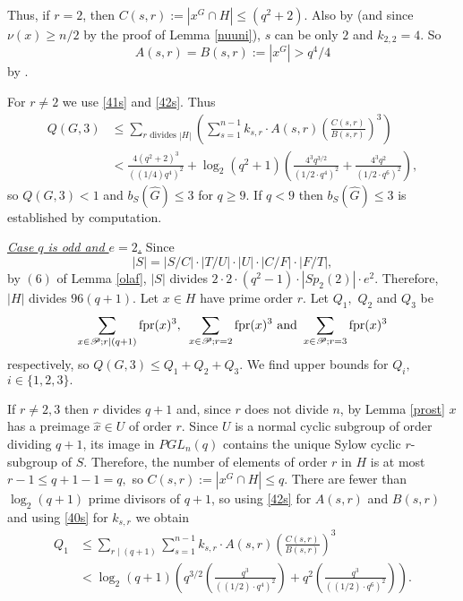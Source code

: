 Thus, if $r=2$, then $C(s,r):=|x^G \cap H|\le (q^2+2)$. Also by \cite[Table 3.8]{fpr2} (and since $\nu(x) \ge n/2$ by the proof of Lemma \ref{nuuni}), $s$ can be only  $2$ and $k_{2,2}=4.$ So
\begin{equation}\label{polup2s}
A(s,r)=B(s,r):=|x^G|> q^{4}/4
\end{equation}
by \cite[Proposition 3.37]{fpr2}. 

For $r\ne 2$ we use \eqref{41s} and \eqref{42s}. Thus
\begin{equation*}
\begin{aligned}
Q(G,3) & \le  \sum_{r \text{ divides } |H|} \left(
\sum_{s=1}^{n-1} k_{s,r} \cdot A(s,r) \left(\frac{C(s,r)}{B(s,r)}  \right)^3 \right)\\
 & <   \frac{4(q^2+2)^3}{((1/4)q^4)^2}  
+\log_2 \left( q^2+1 \right) \left(\frac{4^3 q^{3/2}}{(1/2 \cdot q^4)^2}  + \frac{4^3q^2}{(1/2 \cdot q^{6})^2}  \right),
\end{aligned}
\end{equation*}
so $Q(G,3)<1$ and $b_S(\hat{G})\le 3$ for  $q \ge 9.$ If $q<9$ then $b_S(\hat{G})\le 3$ is established by computation.

\medskip

\underline{\it Case ${q}$ is odd and ${e=2}$.}
 Since $$|S|= |S/C|\cdot|T/U |\cdot|U|\cdot|C/F |\cdot|F/T |,$$ by $(6)$ of Lemma \ref{olaf}, $|S|$ divides
$2 \cdot 2 \cdot (q^2-1) \cdot |Sp_2(2)| \cdot e^2.$
Therefore,  $|H|$ divides $96(q+1).$ Let $x \in H$ have prime order $r$.  Let $Q_1,$ $Q_2$ and $Q_3$ be  $$\sum_{{x} \in \mathscr{P}; r \mid (q+1)}{\mathrm{fpr}}({x})^3, \text{ } \sum_{{x} \in \mathscr{P}; r=2}{\mathrm{fpr}}({x})^3 \text{ and } \sum_{{x} \in \mathscr{P}; r=3}{\mathrm{fpr}}({x})^3$$ respectively, so $Q(G,3)\le Q_1 + Q_2 +Q_3$. We  find upper bounds for $Q_i,$ $i \in \{1,2,3\}.$

If $r \ne 2, 3$ then $r$ divides $q+1$ and, since $r$ does not divide $n$, by Lemma \ref{prost} $x$ has a preimage $\hat{x} \in U$ of order $r$. Since $U$ is a normal cyclic subgroup of order dividing $q+1$, its image in $PGL_n(q)$ contains the unique Sylow cyclic $r$-subgroup of $S.$ Therefore, the number of elements of order $r$ in $H$ is at most $r-1\le q+1-1=q,$ so $C(s,r):=|x^G \cap H|\le q$. There are fewer than $\log_2(q+1)$ prime divisors of $q+1$, so using \eqref{42s} for $A(s,r)$ and $B(s,r)$ and  using \eqref{40s} for $k_{s,r}$ we obtain
\begin{equation*}
\begin{aligned}
Q_1& \le \sum_{r \mid (q+1)} 
\sum_{s=1}^{n-1} k_{s,r} \cdot A(s,r) \left(\frac{C(s,r)}{B(s,r)}  \right)^3\\
&<    
\log_2(q+1) \left(q^{3/2}\left(\frac{q^3}{((1/2) \cdot q^4)^2} \right) + q^2\left(\frac{q^3}{((1/2) \cdot q^{6})^2} \right) \right).
\end{aligned}
\end{equation*}

